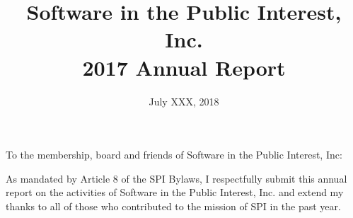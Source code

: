 \documentclass[a4paper]{report}
\begin{document}
\title{Software in the Public Interest, Inc.\\
2017 Annual Report}
\date{July XXX, 2018}

\maketitle

\newpage


\hspace{1em}

To the membership, board and friends of Software in the Public Interest, Inc:

As mandated by Article 8 of the SPI Bylaws, I respectfully submit this annual
report on the activities of Software in the Public Interest, Inc. and extend my
thanks to all of those who contributed to the mission of SPI in the past year.
\end{document}
